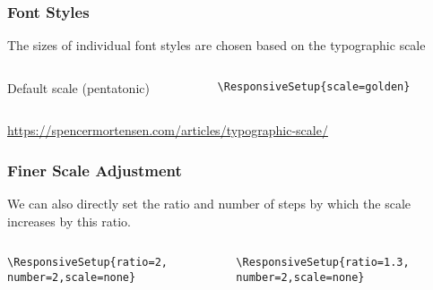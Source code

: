 \begin{frame}[fragile]
  \frametitle{Font Styles}

  The sizes of individual font styles are chosen based on the typographic scale

\begin{columns}
  \begin{column}{0.5\textwidth}
Default scale (pentatonic)
\end{column}
  \begin{column}{0.5\textwidth}
\begin{verbatim}
\ResponsiveSetup{scale=golden}
\end{verbatim}
\end{column}
\end{columns}
\url{https://spencermortensen.com/articles/typographic-scale/}

\end{frame}

\begin{frame}[fragile]
  \frametitle{Finer Scale Adjustment}

  We can also directly set the ratio and number of steps by which the scale increases by this ratio.

\begin{columns}
  \begin{column}{0.5\textwidth}
\begin{verbatim}
\ResponsiveSetup{ratio=2,
number=2,scale=none}
\end{verbatim}
\end{column}
  \begin{column}{0.5\textwidth}
\begin{verbatim}
\ResponsiveSetup{ratio=1.3,
number=2,scale=none}
\end{verbatim}
\end{column}
\end{columns}

\end{frame}

